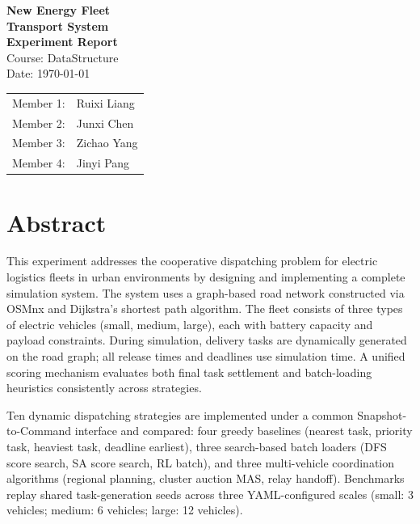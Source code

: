 \documentclass[12pt,a4paper,oneside]{book}
\begin{document}
\begin{titlepage}
    \begin{center}
        \vspace*{3cm}
        {\Huge\textbf{New Energy Fleet}}\\[4pt]
        {\Huge\textbf{Transport System}}\\[12pt]
        {\Large\textbf{Experiment Report}}\\[2cm]
        {\large Course: DataStructure}\\[0.8cm]
        {\large Date: \today}\\[3cm]
        \begin{tabular}{rl}
            Member 1: & Ruixi Liang \\
            Member 2: & Junxi Chen \\
            Member 3: & Zichao Yang \\
            Member 4: & Jinyi Pang \\
        \end{tabular}
        \vfill
    \end{center}
\end{titlepage}

\chapter*{Abstract}

This experiment addresses the cooperative dispatching problem for electric logistics fleets in urban environments by designing and implementing a complete simulation system. The system uses a graph-based road network constructed via OSMnx and Dijkstra's shortest path algorithm. The fleet consists of three types of electric vehicles (small, medium, large), each with battery capacity and payload constraints. During simulation, delivery tasks are dynamically generated on the road graph; all release times and deadlines use simulation time. A unified scoring mechanism evaluates both final task settlement and batch-loading heuristics consistently across strategies.

Ten dynamic dispatching strategies are implemented under a common Snapshot-to-Command interface and compared: four greedy baselines (nearest task, priority task, heaviest task, deadline earliest), three search-based batch loaders (DFS score search, SA score search, RL batch), and three multi-vehicle coordination algorithms (regional planning, cluster auction MAS, relay handoff). Benchmarks replay shared task-generation seeds across three YAML-configured scales (small: 3 vehicles; medium: 6 vehicles; large: 12 vehicles).
\end{document}

